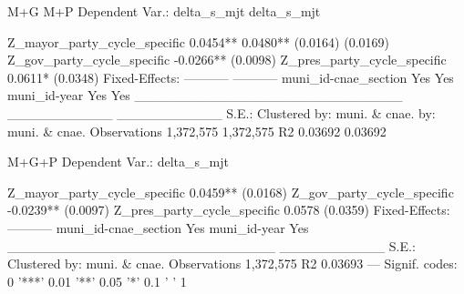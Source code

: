                                            M+G               M+P
Dependent Var.:                    delta_s_mjt       delta_s_mjt
                                                                
Z_mayor_party_cycle_specific          0.0454**          0.0480**
                                     (0.0164)          (0.0169) 
Z_gov_party_cycle_specific           -0.0266**                  
                                     (0.0098)                   
Z_pres_party_cycle_specific                             0.0611* 
                                                       (0.0348) 
Fixed-Effects:                     -----------       -----------
muni_id-cnae_section                       Yes               Yes
muni_id-year                               Yes               Yes
____________________________       ___________       ___________
S.E.: Clustered              by: muni. & cnae. by: muni. & cnae.
Observations                         1,372,575         1,372,575
R2                                     0.03692           0.03692

                                         M+G+P
Dependent Var.:                    delta_s_mjt
                                              
Z_mayor_party_cycle_specific          0.0459**
                                     (0.0168) 
Z_gov_party_cycle_specific           -0.0239**
                                     (0.0097) 
Z_pres_party_cycle_specific           0.0578  
                                     (0.0359) 
Fixed-Effects:                     -----------
muni_id-cnae_section                       Yes
muni_id-year                               Yes
____________________________       ___________
S.E.: Clustered              by: muni. & cnae.
Observations                         1,372,575
R2                                     0.03693
---
Signif. codes: 0 '***' 0.01 '**' 0.05 '*' 0.1 ' ' 1
